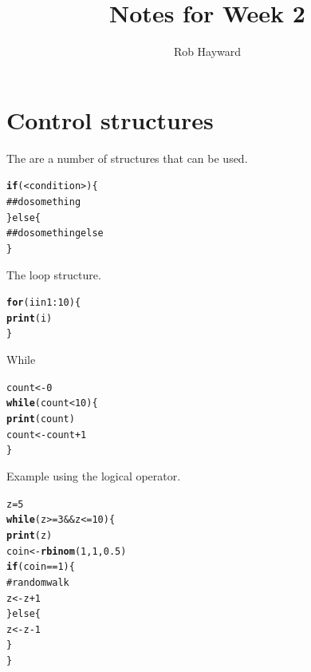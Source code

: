 \documentclass{article}\usepackage{graphicx, color}
\title{Notes for Week 2}
\author{Rob Hayward}
\makeatletter
\newcommand{\hlfunctioncall}[1]{\textcolor[rgb]{0.501960784313725,0,0.329411764705882}{\textbf{#1}}}%
\newcommand{\hlcomment}[1]{\textcolor[rgb]{0.180392156862745,0.6,0.341176470588235}{#1}}%
\newenvironment{kframe}{%
 \def\at@end@of@kframe{}%
 \ifinner\ifhmode%
  \def\at@end@of@kframe{\end{minipage}}%
  \begin{minipage}{\columnwidth}%
 \fi\fi%
 \def\FrameCommand##1{\hskip\@totalleftmargin \hskip-\fboxsep
 \colorbox{shadecolor}{##1}\hskip-\fboxsep
     \hskip-\linewidth \hskip-\@totalleftmargin \hskip\columnwidth}%
 \MakeFramed {\advance\hsize-\width
   \@totalleftmargin\z@ \linewidth\hsize
   \@setminipage}}%
 {\par\unskip\endMakeFramed%
 \at@end@of@kframe}
\newenvironment{knitrout}{}{} %
\makeatother
\begin{document}
\maketitle

\section{Control structures}
The are a number of structures that can be used. 
\begin{knitrout}
\color{fgcolor}\begin{kframe}
\begin{alltt}
\hlfunctioncall{if}(<condition>) \{
\hlcomment{  ## do something}
\} else \{
\hlcomment{  ## do something else}
\}
\end{alltt}
\end{kframe}
\end{knitrout}

The loop structure.
\begin{knitrout}
\color{fgcolor}\begin{kframe}
\begin{alltt}
\hlfunctioncall{for} (i in 1:10) \{
    \hlfunctioncall{print}(i)
\}
\end{alltt}
\end{kframe}
\end{knitrout}

While 
\begin{knitrout}
\color{fgcolor}\begin{kframe}
\begin{alltt}
count <- 0
\hlfunctioncall{while} (count < 10) \{
    \hlfunctioncall{print}(count)
    count <- count + 1
\}
\end{alltt}
\end{kframe}
\end{knitrout}

Example using the logical operator. 
\begin{knitrout}
\color{fgcolor}\begin{kframe}
\begin{alltt}
z = 5
\hlfunctioncall{while} (z >= 3 && z <= 10) \{
    \hlfunctioncall{print}(z)
    coin <- \hlfunctioncall{rbinom}(1, 1, 0.5)
    \hlfunctioncall{if} (coin == 1) \{
\hlcomment{        # random walk}
        z <- z + 1
    \} else \{
        z <- z - 1
    \}
\}
\end{alltt}
\end{kframe}
\end{knitrout}
\end{document}
